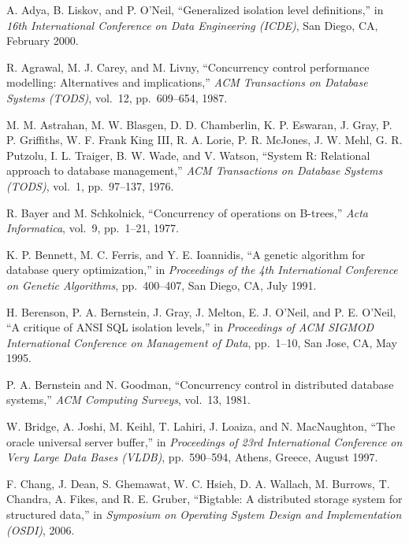 \documentclass[a4paper,11pt,twoside,openright]{book}
\begin{document}
\begin{enumerate}[label={[\arabic*]}]

\item
  A. Adya, B. Liskov, and P. O'Neil, ``Generalized isolation level
  definitions,'' in \emph{16th International Conference on Data Engineering (ICDE)}, San
Diego, CA, February 2000.
\item
  R. Agrawal, M. J. Carey, and M. Livny, ``Concurrency control
  performance modelling: Alternatives and implications,'' \emph{ACM
  Transactions on Database Systems (TODS)}, vol.~12, pp.~609--654,
  1987.
\item
  M. M. Astrahan, M. W. Blasgen, D. D. Chamberlin, K. P. Eswaran, J.
  Gray, P. P. Griffiths, W. F. Frank King III, R. A. Lorie, P. R.
  McJones, J. W. Mehl, G. R. Putzolu, I. L. Traiger, B. W. Wade, and V.
  Watson, ``System R: Relational approach to database management,''
  \emph{ACM Transactions on Database Systems} \emph{(TODS)}, vol.~1,
  pp.~97--137, 1976.
\item
  R. Bayer and M. Schkolnick, ``Concurrency of operations on B-trees,''
  \emph{Acta} \emph{Informatica}, vol.~9, pp.~1--21, 1977.
\item
  K. P. Bennett, M. C. Ferris, and Y. E. Ioannidis, ``A genetic
  algorithm for database query optimization,'' in \emph{Proceedings of
  the 4th International Conference on Genetic Algorithms},
  pp.~400--407, San Diego, CA, July 1991.
\item
  H. Berenson, P. A. Bernstein, J. Gray, J. Melton, E. J. O'Neil, and P.
  E. O'Neil, ``A critique of ANSI SQL isolation levels,'' in
  \emph{Proceedings of ACM SIGMOD} \emph{International Conference on
  Management of Data}, pp.~1--10, San Jose, CA, May 1995.
\item
  P. A. Bernstein and N. Goodman, ``Concurrency control in distributed
  database systems,'' \emph{ACM Computing Surveys}, vol.~13, 1981.
\item
  W. Bridge, A. Joshi, M. Keihl, T. Lahiri, J. Loaiza, and N.
  MacNaughton, ``The oracle universal server buffer,'' in
  \emph{Proceedings of 23rd International Conference} \emph{on Very
  Large Data Bases (VLDB)}, pp.~590--594, Athens, Greece, August 1997.
\item
  F. Chang, J. Dean, S. Ghemawat, W. C. Hsieh, D. A. Wallach, M.
  Burrows, T. Chandra, A. Fikes, and R. E. Gruber, ``Bigtable: A
  distributed storage system for structured data,'' in \emph{Symposium
  on Operating System Design and} \emph{Implementation (OSDI)}, 2006.
\item

\end{enumerate}
\end{document}
